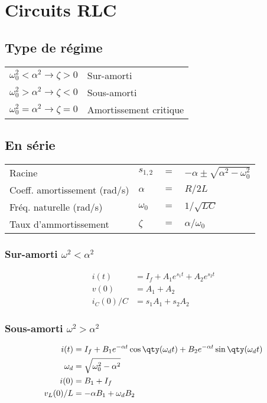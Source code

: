 \section{Circuits RLC}
\subsection{Type de régime}
\begin{tabular}{ll}
\(\omega_0^2 < \alpha^2 \rightarrow \zeta > 0\) & Sur-amorti\\
\(\omega_0^2 > \alpha^2 \rightarrow \zeta < 0 \) & Sous-amorti\\
\(\omega_0^2 = \alpha^2 \rightarrow \zeta = 0\) & Amortissement critique\\
\end{tabular}

\subsection{En série}
\begin{tabular}{llcl}
Racine  & \(s_{1,2}\) & \(=\) & \( -\alpha \pm \sqrt{\alpha^2-\omega_0^2} \) \\
Coeff. amortissement (rad/s) & \( \alpha\) & \(=\) & \(R/2L \) \\
Fréq. naturelle (rad/s) & \(\omega_0\) & \(=\) & \(1/\sqrt{LC} \) \\
Taux d'ammortissement & \( \zeta\) & \(=\) & \(\alpha/\omega_0\)
\end{tabular}

\subsubsection{Sur-amorti $\omega^2 < \alpha^2$}
\begin{align*}
i(t) &= I_f + A_1 e^{s_1 t}+A_2 e^{s_2t} \\
v(0) &= A_1+A_2  \\
i_C(0)/C &= s_1 A_1 + s_2 A_2
\end{align*}

\subsubsection{Sous-amorti $\omega^2 > \alpha^2$}
\begin{align*}
    i(t) &= I_f + B_1 e^{-\alpha t}\cos\qty(\omega_d t)+B_2 e^{-\alpha t}\sin\qty(\omega_d t)\\
    \omega_d &= \sqrt{\omega_0^2-\alpha^2}\\
    i(0) &= B_1 + I_f\\
    v_L(0)/L &= -\alpha B_1 + \omega_d B_2
\end{align*}

